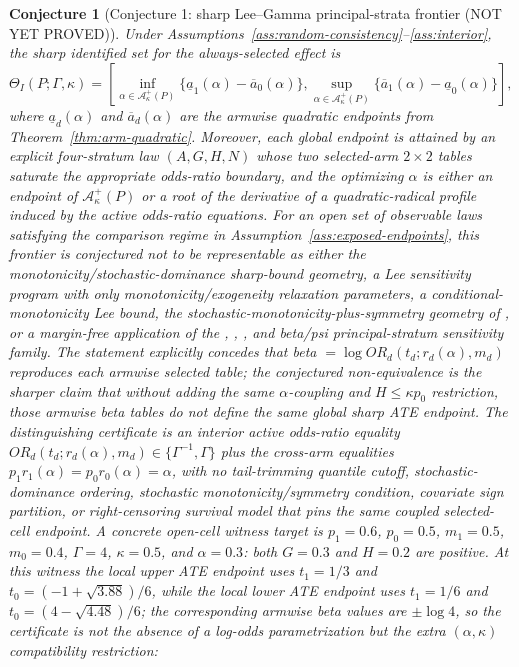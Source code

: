 \documentclass[11pt]{article}
\theoremstyle{definition}
\theoremstyle{plain}
\newtheorem{conjecture}{Conjecture}
\theoremstyle{remark}
\begin{document}
\begin{conjecture}[Conjecture 1: sharp Lee--Gamma principal-strata frontier (NOT YET PROVED)]\label{conj:lee-gamma-frontier}
Under Assumptions~\ref{ass:random-consistency}--\ref{ass:interior}, the sharp identified set for the always-selected effect is
\[
  \Theta_I(P;\Gamma,\kappa)=
  \left[
    \inf_{\alpha\in\mathcal A_\kappa^+(P)}
      \{\underline a_1(\alpha)-\overline a_0(\alpha)\},
    \sup_{\alpha\in\mathcal A_\kappa^+(P)}
      \{\overline a_1(\alpha)-\underline a_0(\alpha)\}
  \right],
\]
where \(\underline a_d(\alpha)\) and \(\overline a_d(\alpha)\) are the armwise quadratic endpoints from Theorem~\ref{thm:arm-quadratic}.  Moreover, each global endpoint is attained by an explicit four-stratum law \((A,G,H,N)\) whose two selected-arm \(2\times2\) tables saturate the appropriate odds-ratio boundary, and the optimizing \(\alpha\) is either an endpoint of \(\mathcal A_\kappa^+(P)\) or a root of the derivative of a quadratic-radical profile induced by the active odds-ratio equations.
For an open set of observable laws satisfying the comparison regime in Assumption~\ref{ass:exposed-endpoints}, this frontier is conjectured not to be representable as either the \citet{HuberMellace2015SharpSelection} monotonicity/stochastic-dominance sharp-bound geometry, a \citet{LaffersNedela2017Sensitivity} Lee sensitivity program with only monotonicity/exogeneity relaxation parameters, a \citet{Semenova2025GeneralizedLee} conditional-monotonicity Lee bound, the stochastic-monotonicity-plus-symmetry geometry of \citet{Okamoto2025RobustifyLee}, or a margin-free application of the \citet{ShepherdGilbertJemiaiRotnitzky2006}, \citet{JemiaiRotnitzkyShepherdGilbert2007}, \citet{ShepherdRedmanAnkerst2008}, and \citet{ShepherdGilbertDupont2011} beta/psi principal-stratum sensitivity family.  The statement explicitly concedes that beta \(=\log OR_d(t_d;r_d(\alpha),m_d)\) reproduces each armwise selected table; the conjectured non-equivalence is the sharper claim that without adding the same \(\alpha\)-coupling and \(H\le \kappa p_0\) restriction, those armwise beta tables do not define the same global sharp ATE endpoint.  The distinguishing certificate is an interior active odds-ratio equality \(OR_d(t_d;r_d(\alpha),m_d)\in\{\Gamma^{-1},\Gamma\}\) plus the cross-arm equalities \(p_1r_1(\alpha)=p_0r_0(\alpha)=\alpha\), with no tail-trimming quantile cutoff, stochastic-dominance ordering, stochastic monotonicity/symmetry condition, covariate sign partition, or right-censoring survival model that pins the same coupled selected-cell endpoint.  A concrete open-cell witness target is \(p_1=0.6\), \(p_0=0.5\), \(m_1=0.5\), \(m_0=0.4\), \(\Gamma=4\), \(\kappa=0.5\), and \(\alpha=0.3\): both \(G=0.3\) and \(H=0.2\) are positive.  At this witness the local upper ATE endpoint uses \(t_1=1/3\) and \(t_0=(-1+\sqrt{3.88})/6\), while the local lower ATE endpoint uses \(t_1=1/6\) and \(t_0=(4-\sqrt{4.48})/6\); the corresponding armwise beta values are \(\pm\log 4\), so the certificate is not the absence of a log-odds parametrization but the extra \((\alpha,\kappa)\) compatibility restriction:

\end{conjecture}
\end{document}
